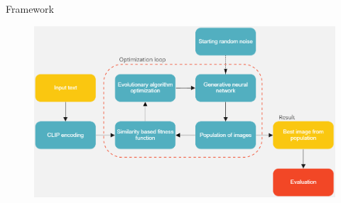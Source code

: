 \documentclass[t]{beamer}
\begin{document}
\begin{frame}[c]{Framework}
\begin{figure}[ht!]
    \centering
    \includegraphics[scale=0.3]{flow.png}
\end{figure} 
\end{frame}
\end{document}
